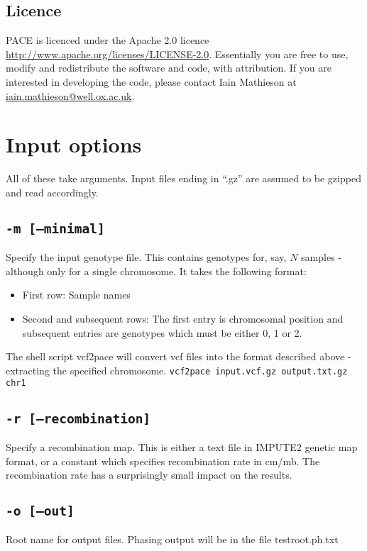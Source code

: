 \documentclass[10pt]{refart}
\begin{document}
\subsection{Licence}
PACE is licenced under the Apache 2.0 licence \url{http://www.apache.org/licenses/LICENSE-2.0}. Essentially you are free to use, modify and redistribute the software and code, with attribution. If you are interested in developing the code, please contact Iain Mathieson at \href{mailto:iain.mathieson@well.ox.ac.uk}{iain.mathieson@well.ox.ac.uk}.

\newpage

\section{Input options}
All of these take arguments. Input files ending in ``.gz'' are assumed to be gzipped and read accordingly. 
\subsection{\texttt{-m [--minimal]}}
Specify the input genotype file. This contains genotypes for, say, $N$ samples - although only for a single chromosome. It takes the following format: 
\begin{itemize}
\item
First row: Sample names
\item
Second and subsequent rows: The first entry is chromosomal position and subsequent entries are genotypes which must be either 0, 1 or 2. 
\end{itemize}
The shell script vcf2pace will convert vcf files into the format described above - extracting the specified chromosome. 
\texttt{vcf2pace input.vcf.gz output.txt.gz chr1}

\subsection{\texttt{-r [--recombination]}}
Specify a recombination map. This is either a text file in IMPUTE2
genetic map format, or a constant which specifies recombination rate
in cm/mb. The recombination rate has a surprisingly small impact on
the results.

\subsection{\texttt{-o [--out]}}
Root name for output files. Phasing output will be in the file {testroot}.ph.txt
\end{document}

